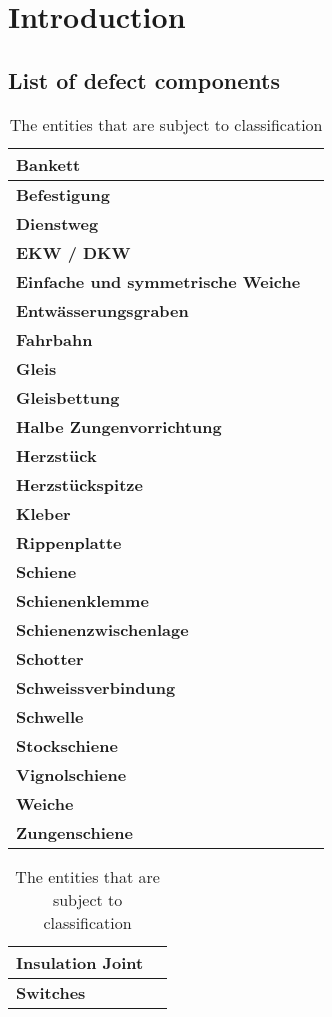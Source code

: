 \chapter{Introduction}
\section{List of defect components}
\label{app:defcomp}
\begin{table}[H]
	\centering
	\begin{tabular}{|l|c|} \hline
		\textbf{Bankett} \\ \hline 
		\textbf{Befestigung} \\ \hline
		\textbf{Dienstweg} \\ \hline
		\textbf{EKW / DKW} \\ \hline
		\textbf{Einfache und symmetrische Weiche} \\ \hline
		\textbf{Entwässerungsgraben} \\ \hline
		\textbf{Fahrbahn} \\ \hline
		\textbf{Gleis} \\ \hline
		\textbf{Gleisbettung} \\ \hline
		\textbf{Halbe Zungenvorrichtung} \\ \hline
		\textbf{Herzstück} \\ \hline
		\textbf{Herzstückspitze} \\ \hline
		\textbf{Kleber} \\ \hline
		\textbf{Rippenplatte} \\ \hline
		\textbf{Schiene} \\ \hline
		\textbf{Schienenklemme} \\ \hline
		\textbf{Schienenzwischenlage} \\ \hline
		\textbf{Schotter} \\ \hline
		\textbf{Schweissverbindung} \\ \hline
		\textbf{Schwelle} \\ \hline
		\textbf{Stockschiene} \\ \hline
		\textbf{Vignolschiene} \\ \hline
		\textbf{Weiche} \\ \hline
		\textbf{Zungenschiene} \\ \hline
	\end{tabular}
	\hspace*{0.5cm}	
	\begin{tabular}{|l|c|} \hline
		\textbf{Insulation Joint} \\ \hline
		\textbf{Switches} \\ \hline 
	\end{tabular}
	\caption{The entities that are subject to classification}
\end{table}

